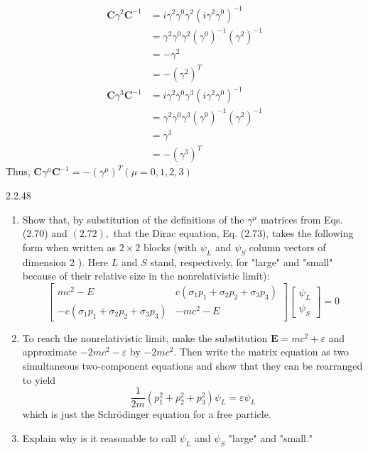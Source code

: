 $$
\begin{aligned}
\mathbf{C} \gamma^{2} \mathbf{C}^{-1} &=i \gamma^{2} \gamma^{0} \gamma^{2}\left(i \gamma^{2} \gamma^{0}\right)^{-1} \\
&=\gamma^{2} \gamma^{0} \gamma^{2}\left(\gamma^{0}\right)^{-1}\left(\gamma^{2}\right)^{-1} \\
&=-\gamma^{2} \\
&=-\left(\gamma^{2}\right)^{T} \\
\mathbf{C} \gamma^{3} \mathbf{C}^{-1} &=i \gamma^{2} \gamma^{0} \gamma^{3}\left(i \gamma^{2} \gamma^{0}\right)^{-1} \\
&=\gamma^{2} \gamma^{0} \gamma^{3}\left(\gamma^{0}\right)^{-1}\left(\gamma^{2}\right)^{-1} \\
&=\gamma^{3} \\
&=-\left(\gamma^{3}\right)^{T}
\end{aligned}
$$
Thus, $\mathbf{C} \gamma^{\mu} \mathbf{C}^{-1}=-\left(\gamma^{\mu}\right)^{T}(\mu=0,1,2,3)$

\newpage


\begin{mybox}{2.2.48}
\begin{enumerate}[$(a)$]
\item Show that, by substitution of the definitions of the $\gamma^{\mu}$ matrices from Eqs. (2.70) and $(2.72),$ that the Dirac equation, Eq. (2.73), takes the following form when written as $2 \times 2$ blocks (with $\psi_{L}$ and $\psi_{S}$ column vectors of dimension 2 ). Here $L$ and $S$ stand, respectively, for "large" and "small" because of their relative size in the nonrelativistic limit):
$$
\begin{bmatrix}
m c^{2}-E & c\left(\sigma_{1} p_{1}+\sigma_{2} p_{2}+\sigma_{3} p_{3}\right) \\
-c\left(\sigma_{1} p_{1}+\sigma_{2} p_{2}+\sigma_{3} p_{3}\right) & -m c^{2}-E
\end{bmatrix}\begin{bmatrix}
\psi_{L} \\
\psi_{S}
\end{bmatrix}=0
$$
\item To reach the nonrelativistic limit, make the substitution $\mathbf{E}=m c^{2}+\varepsilon$ and approximate $-2 m c^{2}-\varepsilon$ by $-2 m c^{2}$. Then write the matrix equation as two simultaneous two-component equations and show that they can be rearranged to yield
$$
\frac{1}{2 m}\left(p_{1}^{2}+p_{2}^{2}+p_{3}^{2}\right) \psi_{L}=\varepsilon \psi_{L}
$$
which is just the Schrödinger equation for a free particle.
\item Explain why is it reasonable to call $\psi_{L}$ and $\psi_{S}$ "large" and "small."
\end{enumerate}
\end{mybox}




